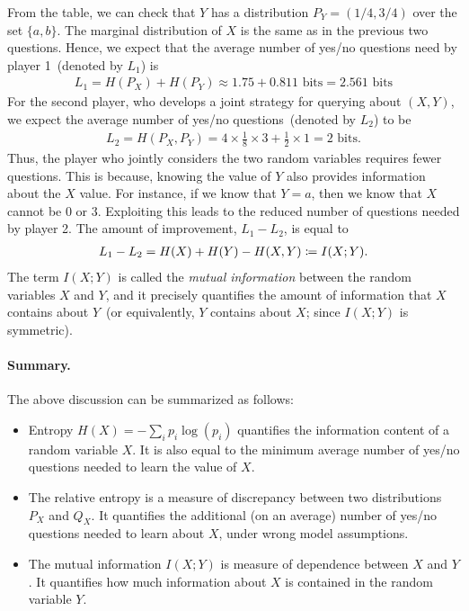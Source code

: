         From the table, we can check that $Y$ has a distribution $P_Y = (1/4, 3/4)$ over the set $\{a, b\}$. The marginal distribution of $X$ is the same as in the previous two questions. Hence, we expect that the average number of yes/no questions need by player 1~(denoted by $L_1$) is 
        \begin{align}
            L_1 = H(P_X) + H(P_Y) \approx 1.75 + 0.811 \text{ bits} = 2.561 \text{ bits}
        \end{align}
        For the second player, who develops a joint strategy for querying about $(X, Y)$, we expect the average number of yes/no questions~(denoted by $L_2$) to be 
        \begin{align}
            L_2 = H(P_X, P_Y) = 4\times \frac{1}{8}\times 3 + \frac{1}{2} \times 1 = 2 \text{ bits}. 
        \end{align}
        Thus, the player who jointly considers the two random variables requires fewer questions. This is because, knowing the value of $Y$ also provides information about the $X$ value. For instance, if we know that $Y=a$, then we know that $X$ cannot be $0$ or $3$. Exploiting this leads to the reduced number of questions needed by player 2. The amount of improvement, $L_1 - L_2$, is equal to 
        \begin{align}
            L_1 - L_2 = H(X) + H(Y) - H(X, Y) \coloneqq I(X; Y). 
        \end{align}
        The term $I(X; Y)$ is called the \emph{mutual information} between the random variables $X$ and $Y$, and it precisely quantifies the amount of information that $X$ contains about $Y$~(or equivalently, $Y$ contains about $X$; since $I(X; Y)$ is symmetric).  

        \paragraph{Summary.} The above discussion can be summarized as follows:
        \begin{itemize}
            \item Entropy $H(X) = -\sum_{i} p_i \log(p_i)$ quantifies the information content of a random variable $X$. It is also equal to the minimum average number of yes/no questions needed to learn the value of $X$. 
            \item The relative entropy is a measure of discrepancy between two distributions $P_X$ and $Q_X$. It quantifies the additional (on an average) number of yes/no questions needed to learn about $X$, under wrong model assumptions. 
            \item The mutual information $I(X; Y)$ is measure of dependence between $X$ and $Y$. It quantifies how much information about $X$ is contained in the random variable $Y$. 
        \end{itemize}
        
